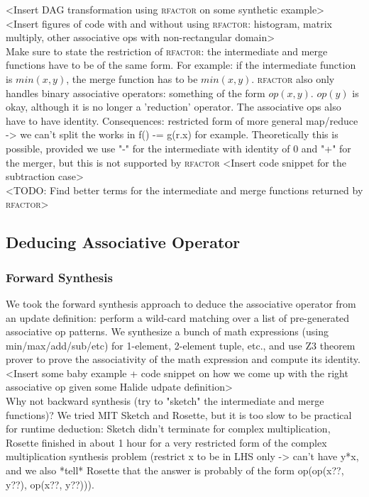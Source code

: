 <Insert DAG transformation using \textsc{rfactor} on some synthetic example> \\

<Insert figures of code with and without using \textsc{rfactor}: histogram, matrix multiply, other associative ops with non-rectangular domain> \\

Make sure to state the restriction of \textsc{rfactor}: the intermediate and merge functions have to be of the same form. For example: if the intermediate function is $min(x, y)$, the merge function has to be $min(x, y)$. \textsc{rfactor} also only handles binary associative operators: something of the form $op(x, y)$. $op(y)$ is okay, although it is no longer a 'reduction' operator. The associative ops also have to have identity. Consequences: restricted form of more general map/reduce -> we can't split the works in f() -= g(r.x) for example. Theoretically this is possible, provided we use "-" for the intermediate with identity of 0 and "+" for the merger, but this is not supported by \textsc{rfactor} <Insert code snippet for the subtraction case> \\

<TODO: Find better terms for the intermediate and merge functions returned by \textsc{rfactor}> \\

\subsection{Deducing Associative Operator}

\subsubsection{Forward Synthesis}

We took the forward synthesis approach to deduce the associative operator from an update definition: perform a wild-card matching over a list of pre-generated associative op patterns. We synthesize a bunch of math expressions (using min/max/add/sub/etc) for 1-element, 2-element tuple, etc., and use Z3 theorem prover to prove the associativity of the math expression and compute its identity. \\

<Insert some baby example + code snippet on how we come up with the right associative op given some Halide udpate definition> \\

Why not backward synthesis (try to "sketch" the intermediate and merge functions)? We tried MIT Sketch and Rosette, but it is too slow to be practical for runtime deduction: Sketch didn't terminate for complex multiplication, Rosette finished in about 1 hour for a very restricted form of the complex multiplication synthesis problem (restrict x to be in LHS only -> can't have y*x, and we also *tell* Rosette that the answer is probably of the form op(op(x??, y??), op(x??, y??))). \\


